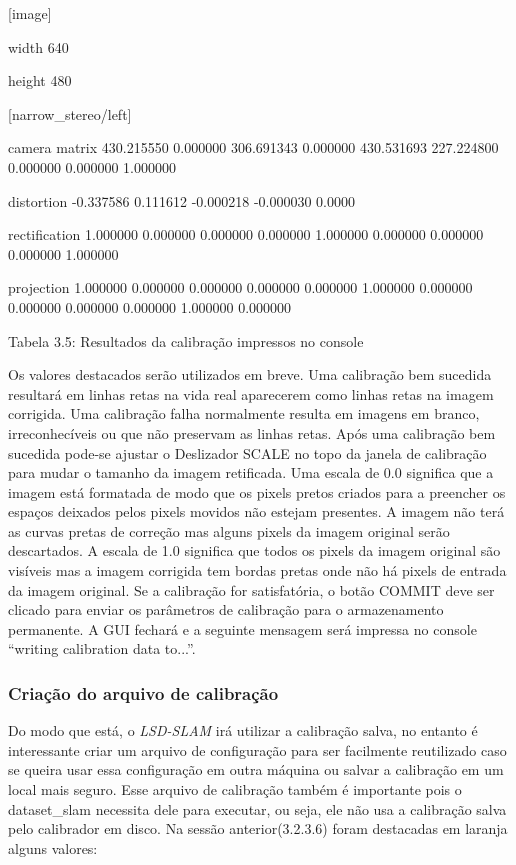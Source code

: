 {[}image{]}

width
640

height
480

{[}narrow\_stereo/left{]}

camera matrix
430.215550 0.000000 306.691343
0.000000 430.531693 227.224800
0.000000 0.000000 1.000000

distortion
-0.337586 0.111612 -0.000218 -0.000030 0.0000

rectification
1.000000 0.000000 0.000000
0.000000 1.000000 0.000000
0.000000 0.000000 1.000000

projection
1.000000 0.000000 0.000000 0.000000
0.000000 1.000000 0.000000 0.000000
0.000000 0.000000 1.000000 0.000000

Tabela 3.5: Resultados da calibração impressos no console
 
Os valores destacados serão utilizados em breve. Uma calibração bem sucedida resultará em linhas retas na vida real aparecerem como linhas retas na imagem corrigida. Uma calibração falha normalmente resulta em imagens em branco, irreconhecíveis ou que não preservam as linhas retas.
Após uma calibração bem sucedida pode-se ajustar o Deslizador SCALE no topo da janela de calibração para mudar o tamanho da imagem retificada. Uma escala de 0.0 significa que a imagem está formatada de modo que os pixels pretos criados para a preencher os espaços deixados pelos pixels movidos não estejam presentes. A imagem não terá as curvas pretas de correção mas alguns pixels da imagem original serão descartados. A escala de 1.0 significa que todos os pixels da imagem original são visíveis mas a imagem corrigida tem bordas pretas onde não há pixels de entrada da imagem original.
Se a calibração for satisfatória, o botão COMMIT deve ser clicado para enviar os parâmetros de calibração para o armazenamento permanente. A GUI fechará e a seguinte mensagem será impressa no console “writing calibration data to...”.

\subsubsection{Criação do arquivo de calibração}

Do modo que está, o \textit{LSD-SLAM} irá utilizar a calibração salva, no entanto é interessante criar um arquivo de configuração para ser facilmente reutilizado caso se queira usar essa configuração em outra máquina ou salvar a calibração em um local mais seguro. Esse arquivo de calibração também é importante pois o dataset\_slam necessita dele para executar, ou seja, ele não usa a calibração salva pelo calibrador em disco. Na sessão anterior(3.2.3.6) foram destacadas em laranja alguns valores:

